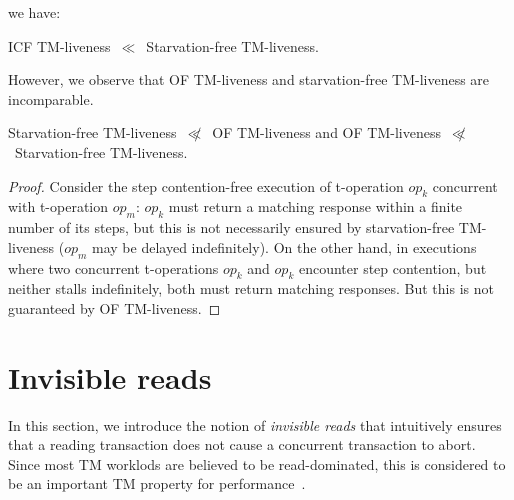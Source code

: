 we have:
\begin{observation}
ICF TM-liveness~$\ll$~Starvation-free TM-liveness.
\end{observation}
However, we observe that OF TM-liveness and starvation-free TM-liveness are incomparable.
\begin{observation}
Starvation-free TM-liveness~$\not\ll$~OF TM-liveness and OF TM-liveness~$\not\ll$~Starvation-free TM-liveness.
\end{observation}
\begin{proof}
Consider the step contention-free execution of t-operation $op_k$ concurrent with t-operation $op_m$: $op_k$
must return a matching response within a finite number of its steps, but this is not necessarily ensured by starvation-free
TM-liveness ($op_m$ may be delayed indefinitely).
On the other hand, in executions where two concurrent t-operations $op_k$ and $op_k$ encounter step contention, but
neither stalls indefinitely, both must return matching responses. But this is not guaranteed by OF TM-liveness.
\end{proof}
\section{Invisible reads}
\label{sec:inv}
In this section, we introduce the notion of \emph{invisible reads} that intuitively ensures that
a reading transaction does not cause a concurrent transaction to abort.
Since most TM worklods are believed to be read-dominated, this is considered to be an important TM property for
performance~\cite{stmbench7, Attiya09-tmread}.

